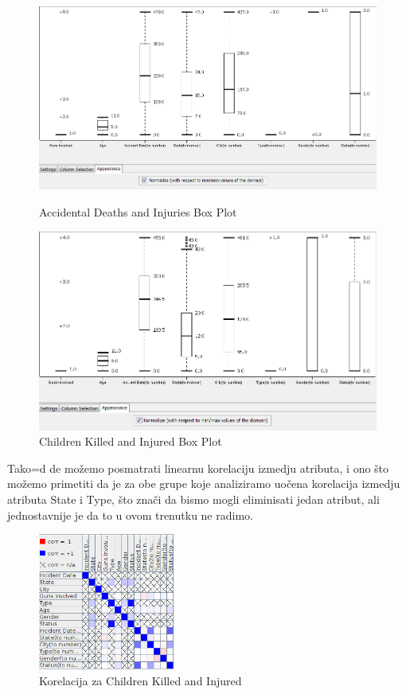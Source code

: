 \documentclass[12pt, a4paper]{article}
\def\dj{\leavevmode\setbox0=\hbox{d}\kern0pt
\rlap{\kern.215em\raise.46\ht0\hbox{-}}d}
\begin{document}
\begin{figure}[H]
\centering
  \begin{minipage}[b]{0.45\textwidth}
    \includegraphics[width=\textwidth]{visualisation_boxplot_accidentalDI.png}
    \caption{Accidental Deaths and Injuries Box Plot}
    \label{fig:ADboxplot}
  \end{minipage}
  \hfill
  \begin{minipage}[b]{0.45\textwidth}
    \includegraphics[width=\textwidth]{visualisation_boxplot_childrenKI.png}
    \caption{Children Killed and Injured Box Plot}
    \label{fig:KIboxplot}
  \end{minipage}
\end{figure}

\newpage
Tako\dj e mo\v zemo posmatrati linearnu korelaciju izmedju atributa, i ono \v sto mo\v zemo primetiti da je za obe grupe koje analiziramo uo\v cena korelacija izmedju atributa State i Type, \v sto zna\v ci da bismo mogli eliminisati jedan atribut, ali jednostavnije je da to u ovom trenutku ne radimo.
\begin{figure}[H]
\centering
\includegraphics[width=0.4\textwidth]{visualisation_linearCorrelation_childrenKI.png}
\caption{Korelacija za Children Killed and Injured}
\end{figure}
\end{document}

